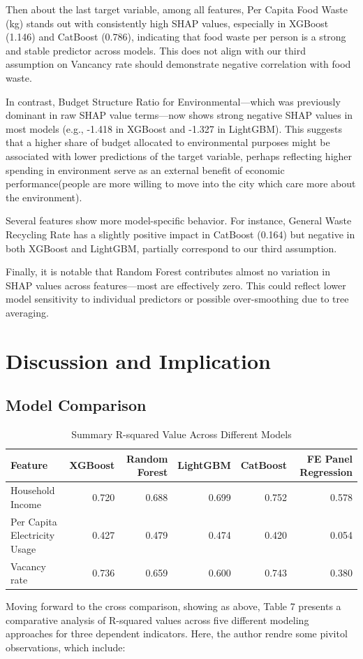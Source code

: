 \documentclass{article}
\begin{document}
Then about the last target variable, among all features, Per Capita Food Waste (kg) stands out with consistently high SHAP values, especially in XGBoost (1.146) and CatBoost (0.786), indicating that food waste per person is a strong and stable predictor across models. 
This does not align with our third assumption on Vancancy rate should demonstrate negative correlation with food waste.

In contrast, Budget Structure Ratio for Environmental—which was previously dominant in raw SHAP value terms—now shows strong negative SHAP values in most models (e.g., -1.418 in XGBoost and -1.327 in LightGBM). 
This suggests that a higher share of budget allocated to environmental purposes might be associated with lower predictions of the target variable, perhaps reflecting higher spending in environment serve as an external benefit of economic performance(people are more willing to move into the city which care more about the environment).

Several features show more model-specific behavior. For instance, General Waste Recycling Rate has a slightly positive impact in CatBoost (0.164) but negative in both XGBoost and LightGBM, partially correspond to our third assumption. 

Finally, it is notable that Random Forest contributes almost no variation in SHAP values across features—most are effectively zero. This could reflect lower model sensitivity to individual predictors or possible over-smoothing due to tree averaging.

\section{Discussion and Implication}
\subsection{Model Comparison}
\begin{table}[htbp]
    \centering
    \caption{Summary R-squared Value Across Different Models}
    \label{tab:r2_pivot_wider}
    \begin{tabular}{lrrrrr}
    \hline
    Feature & XGBoost & Random Forest & LightGBM & CatBoost & FE Panel Regression\\
    \hline
    Household Income & 0.720 & 0.688 & 0.699 & 0.752 & 0.578\\
    Per Capita Electricity Usage & 0.427 & 0.479 & 0.474 & 0.420 & 0.054\\
    Vacancy rate & 0.736 & 0.659 & 0.600 & 0.743 & 0.380\\
    \hline
    \end{tabular}
    \end{table}
Moving forward to the cross comparison, showing as above, 
Table 7 presents a comparative analysis of R-squared values across five different modeling approaches for three dependent indicators. 
Here, the author rendre some pivitol observations, which include:
\end{document}
